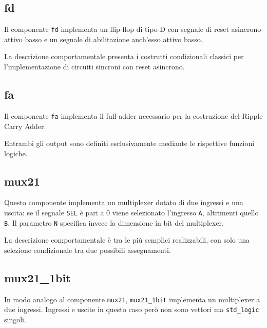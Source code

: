 \documentclass [11pt,a4paper,oneside]{article}
\newcommand{\component}[1]{\texttt{#1}}
\newcommand{\identifier}[1]{\texttt{#1}}
\begin{document}


\subsection{fd}

Il componente \component{fd} implementa un flip-flop di tipo D con segnale di
reset asincrono attivo basso e un segnale di abilitazione anch'esso
attivo basso.



La descrizione comportamentale presenta i costrutti condizionali
classici per l'implementazione di circuiti sincroni con reset asincrono.



\subsection{fa}

Il componente \component{fa} implementa il full-adder necessario per la
costruzione del Ripple Carry Adder.



Entrambi gli output sono definiti esclusivamente mediante le
rispettive funzioni logiche.



\subsection{mux21}

Questo componente implementa un multiplexer dotato di due ingressi e una
uscita: se il segnale \identifier{SEL} è pari a 0 viene selezionato l'ingresso
\identifier{A}, altrimenti quello \identifier{B}.
Il parametro \identifier{N} specifica invece la dimensione in bit del multiplexer.



La descrizione comportamentale è tra le più semplici realizzabili, con solo
una selezione condizionale tra due possibili assegnamenti.



\subsection{mux21\_1bit}

In modo analogo al componente \component{mux21}, \component{mux21\_1bit} implementa un
multiplexer a due ingressi. Ingressi e uscite in questo caso però non sono 
vettori ma \component{std\_logic} singoli.
\end{document}
